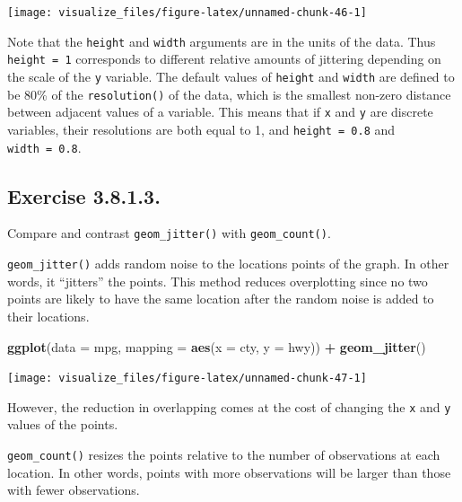 \documentclass[]{book}
\newenvironment{Shaded}{\begin{snugshade}}{\end{snugshade}}
\newcommand{\DataTypeTok}[1]{\textcolor[rgb]{0.13,0.29,0.53}{#1}}
\newcommand{\KeywordTok}[1]{\textcolor[rgb]{0.13,0.29,0.53}{\textbf{#1}}}
\newcommand{\NormalTok}[1]{#1}
\newcommand{\OperatorTok}[1]{\textcolor[rgb]{0.81,0.36,0.00}{\textbf{#1}}}
\newcommand{\StringTok}[1]{\textcolor[rgb]{0.31,0.60,0.02}{#1}}
\theoremstyle{plain}
\theoremstyle{remark}
\begin{document}
\begin{center}\texttt{[image: visualize\_files/figure-latex/unnamed-chunk-46-1]} \end{center}

Note that the \texttt{height} and \texttt{width} arguments are in the units of the data.
Thus \texttt{height\ =\ 1} corresponds to different relative amounts of jittering depending on the scale of the \texttt{y} variable.
The default values of \texttt{height} and \texttt{width} are defined to be 80\% of the
\texttt{resolution()} of the data, which is the smallest non-zero distance between adjacent values of a variable.
This means that if \texttt{x} and \texttt{y} are discrete variables, their resolutions are both
equal to 1, and \texttt{height\ =\ 0.8} and \texttt{width\ =\ 0.8}.

\hypertarget{exercise-3.8.1.3.}{%
\subsection*{\texorpdfstring{Exercise {3.8.1.3}.}{Exercise 3.8.1.3.}}\label{exercise-3.8.1.3.}}

Compare and contrast \texttt{geom\_jitter()} with \texttt{geom\_count()}.

\texttt{geom\_jitter()} adds random noise to the locations points of the graph.
In other words, it ``jitters'' the points.
This method reduces overplotting since no two points
are likely to have the same location after the random noise is added to their locations.

\begin{Shaded}
\begin{Highlighting}[]
\KeywordTok{ggplot}\NormalTok{(}\DataTypeTok{data =}\NormalTok{ mpg, }\DataTypeTok{mapping =} \KeywordTok{aes}\NormalTok{(}\DataTypeTok{x =}\NormalTok{ cty, }\DataTypeTok{y =}\NormalTok{ hwy)) }\OperatorTok{+}
\StringTok{  }\KeywordTok{geom_jitter}\NormalTok{()}
\end{Highlighting}
\end{Shaded}

\begin{center}\texttt{[image: visualize\_files/figure-latex/unnamed-chunk-47-1]} \end{center}

However, the reduction in overlapping comes at the cost of changing the \texttt{x} and \texttt{y}
values of the points.

\texttt{geom\_count()} resizes the points relative to the number of observations at each location.
In other words, points with more observations will be larger than those with fewer observations.
\end{document}
